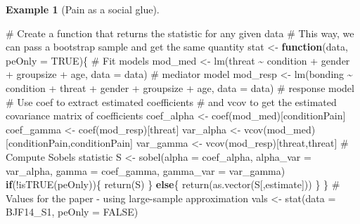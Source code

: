 \documentclass[
  11pt,
  letterpaper,
]{scrbook}
\newenvironment{Shaded}{\begin{snugshade}}{\end{snugshade}}
\newcommand{\AttributeTok}[1]{\textcolor[rgb]{0.40,0.45,0.13}{#1}}
\newcommand{\CommentTok}[1]{\textcolor[rgb]{0.37,0.37,0.37}{#1}}
\newcommand{\ConstantTok}[1]{\textcolor[rgb]{0.56,0.35,0.01}{#1}}
\newcommand{\ControlFlowTok}[1]{\textcolor[rgb]{0.00,0.23,0.31}{\textbf{#1}}}
\newcommand{\FunctionTok}[1]{\textcolor[rgb]{0.28,0.35,0.67}{#1}}
\newcommand{\NormalTok}[1]{\textcolor[rgb]{0.00,0.23,0.31}{#1}}
\newcommand{\OtherTok}[1]{\textcolor[rgb]{0.00,0.23,0.31}{#1}}
\newcommand{\SpecialCharTok}[1]{\textcolor[rgb]{0.37,0.37,0.37}{#1}}
\newcommand{\StringTok}[1]{\textcolor[rgb]{0.13,0.47,0.30}{#1}}
\theoremstyle{definition}
\newtheorem{example}{Example}[chapter]
\theoremstyle{definition}
\theoremstyle{remark}
\begin{document}
\begin{example}[Pain as a social
glue]
\begin{Shaded}
\begin{Highlighting}[]
\CommentTok{\# Create a function that returns the statistic for any given data}
\CommentTok{\# This way, we can pass a bootstrap sample and get the same quantity}
\NormalTok{stat }\OtherTok{\textless{}{-}} \ControlFlowTok{function}\NormalTok{(data, }\AttributeTok{peOnly =} \ConstantTok{TRUE}\NormalTok{)\{}
  \CommentTok{\# Fit models}
\NormalTok{mod\_med }\OtherTok{\textless{}{-}} \FunctionTok{lm}\NormalTok{(threat }\SpecialCharTok{\textasciitilde{}}\NormalTok{ condition }\SpecialCharTok{+}\NormalTok{ gender }\SpecialCharTok{+}\NormalTok{ groupsize }\SpecialCharTok{+}\NormalTok{ age,}
          \AttributeTok{data =}\NormalTok{ data) }\CommentTok{\# mediator model}
\NormalTok{mod\_resp }\OtherTok{\textless{}{-}} \FunctionTok{lm}\NormalTok{(bonding }\SpecialCharTok{\textasciitilde{}}\NormalTok{ condition }\SpecialCharTok{+}\NormalTok{ threat }\SpecialCharTok{+}\NormalTok{ gender }\SpecialCharTok{+}\NormalTok{ groupsize }\SpecialCharTok{+}\NormalTok{ age,}
           \AttributeTok{data =}\NormalTok{ data) }\CommentTok{\# response model}
\CommentTok{\# Use \textquotesingle{}coef\textquotesingle{} to extract estimated coefficients}
\CommentTok{\# and \textquotesingle{}vcov\textquotesingle{} to get the estimated covariance matrix of coefficients}
\NormalTok{coef\_alpha }\OtherTok{\textless{}{-}} \FunctionTok{coef}\NormalTok{(mod\_med)[}\StringTok{\textquotesingle{}conditionPain\textquotesingle{}}\NormalTok{]}
\NormalTok{coef\_gamma }\OtherTok{\textless{}{-}} \FunctionTok{coef}\NormalTok{(mod\_resp)[}\StringTok{\textquotesingle{}threat\textquotesingle{}}\NormalTok{]}
\NormalTok{var\_alpha }\OtherTok{\textless{}{-}} \FunctionTok{vcov}\NormalTok{(mod\_med)[}\StringTok{\textquotesingle{}conditionPain\textquotesingle{}}\NormalTok{,}\StringTok{\textquotesingle{}conditionPain\textquotesingle{}}\NormalTok{]}
\NormalTok{var\_gamma }\OtherTok{\textless{}{-}} \FunctionTok{vcov}\NormalTok{(mod\_resp)[}\StringTok{\textquotesingle{}threat\textquotesingle{}}\NormalTok{,}\StringTok{\textquotesingle{}threat\textquotesingle{}}\NormalTok{]}
  \CommentTok{\# Compute Sobel\textquotesingle{}s statistic}
\NormalTok{  S }\OtherTok{\textless{}{-}} \FunctionTok{sobel}\NormalTok{(}\AttributeTok{alpha =}\NormalTok{ coef\_alpha,}
             \AttributeTok{alpha\_var =}\NormalTok{ var\_alpha,}
             \AttributeTok{gamma =}\NormalTok{ coef\_gamma,}
             \AttributeTok{gamma\_var =}\NormalTok{ var\_gamma)}
  \ControlFlowTok{if}\NormalTok{(}\SpecialCharTok{!}\FunctionTok{isTRUE}\NormalTok{(peOnly))\{}
    \FunctionTok{return}\NormalTok{(S)}
\NormalTok{  \} }\ControlFlowTok{else}\NormalTok{\{}
    \FunctionTok{return}\NormalTok{(}\FunctionTok{as.vector}\NormalTok{(S[,}\StringTok{\textquotesingle{}estimate\textquotesingle{}}\NormalTok{]))}
\NormalTok{  \}}
\NormalTok{\}}
\CommentTok{\# Values for the paper {-} using large{-}sample approximation}
\NormalTok{vals }\OtherTok{\textless{}{-}} \FunctionTok{stat}\NormalTok{(}\AttributeTok{data =}\NormalTok{ BJF14\_S1, }\AttributeTok{peOnly =} \ConstantTok{FALSE}\NormalTok{)}
\end{Highlighting}
\end{Shaded}


\end{example}
\end{document}
